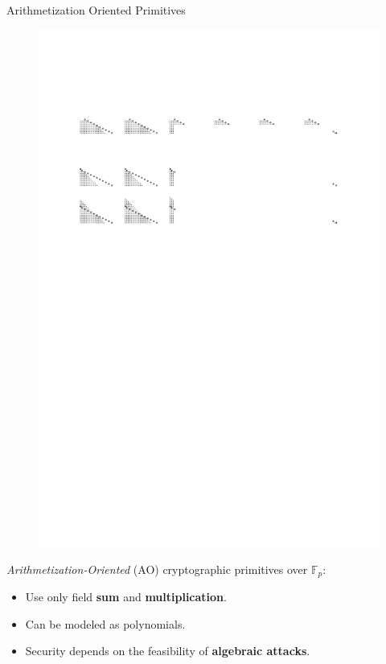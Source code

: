 \documentclass[beamer={10pt,xcolor=dvipsnames},target=mst]{thud}
\begin{document}
\begin{frame}{Arithmetization Oriented Primitives}
  \begin{figure}
    \centering
    \includegraphics[scale=1.0]{res/HoevenL2019.pdf}
  \end{figure}

  \emph{Arithmetization-Oriented} (AO) cryptographic primitives over \(\mathbb{F}_p\):
  \begin{itemize}
    \item Use only field \textbf{sum} and \textbf{multiplication}.
    \item Can be modeled as polynomials.
    \item Security depends on the feasibility of \textbf{algebraic attacks}.
  \end{itemize}
\end{frame}
\end{document}
